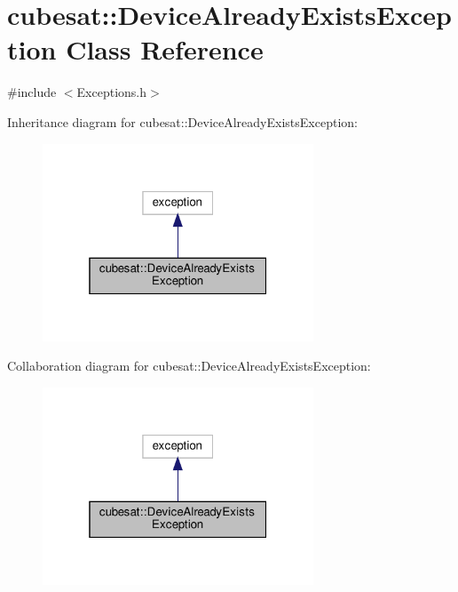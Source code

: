 \hypertarget{classcubesat_1_1DeviceAlreadyExistsException}{}\section{cubesat\+:\+:Device\+Already\+Exists\+Exception Class Reference}
\label{classcubesat_1_1DeviceAlreadyExistsException}


{\ttfamily \#include $<$Exceptions.\+h$>$}



Inheritance diagram for cubesat\+:\+:Device\+Already\+Exists\+Exception\+:\nopagebreak
\begin{figure}[H]
\begin{center}
\leavevmode
\includegraphics[width=229pt]{classcubesat_1_1DeviceAlreadyExistsException__inherit__graph}
\end{center}
\end{figure}


Collaboration diagram for cubesat\+:\+:Device\+Already\+Exists\+Exception\+:\nopagebreak
\begin{figure}[H]
\begin{center}
\leavevmode
\includegraphics[width=229pt]{classcubesat_1_1DeviceAlreadyExistsException__coll__graph}
\end{center}
\end{figure}
